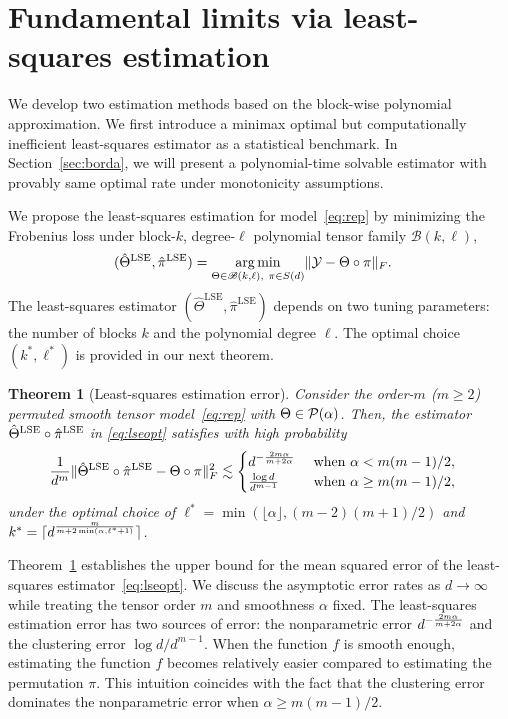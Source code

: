 \documentclass{article}
\newtheorem{thm}{Theorem}
\theoremstyle{definition}
\def\caliB{\mathscr{B}}
\begin{document}
\section{Fundamental limits via least-squares estimation}\label{sec:lse}
We develop two estimation methods based on the block-wise polynomial approximation. We first introduce a minimax optimal but computationally inefficient least-squares estimator as a statistical benchmark. In Section~\ref{sec:borda}, we will present a polynomial-time solvable estimator with provably same optimal rate under monotonicity assumptions.

We propose the least-squares estimation for model~\eqref{eq:rep} by minimizing the Frobenius loss under block-$k$, degree-$\ell$ polynomial tensor family $\caliB(k,\ell)$, 
\begin{align}\label{eq:lseopt}
    (\hat\Theta^{\text{LSE}},\hat \pi^{\text{LSE}}) &= \argmin_{\Theta\in\caliB(k,\ell), \  \pi\in S(d)}\FnormSize{}{\tY-\Theta\circ\pi}.
\end{align}
The least-squares estimator $(\hat\Theta^{\text{LSE}},\hat\pi^{\text{LSE}})$ depends on two tuning parameters: the number of blocks $k$ and the polynomial degree $\ell$. The optimal choice $(k^*,\ell^*)$ is provided in our next theorem. 
\begin{thm}[Least-squares estimation error]\label{thm:LSE} 
Consider the order-$m$ ($m\geq 2$) permuted smooth tensor model~\eqref{eq:rep} with $\Theta\in\mathcal{P}(\alpha)$.
Then, the estimator $\hat\Theta^{\textup{LSE}}\circ\hat\pi^{\textup{LSE}}$  in \eqref{eq:lseopt} satisfies with high probability 
\begin{align}\label{eq:rates}
   \frac{1}{d^m}&\lVert\hat\Theta^{\textup{LSE}}\circ\hat\pi^{\textup{LSE}}-\Theta\circ \pi\rVert_F^2\lesssim  \begin{cases}d^{-{2m\alpha\over m+2\alpha}} & \text{ when } \alpha < m(m-1)/2,\\{\log d\over d^{m-1}}&\text{ when } \alpha \geq m(m-1)/2,
   \end{cases}
\end{align}
under the optimal choice of $\ell^* = \min(\lfloor\alpha\rfloor,(m-2)(m+1)/2)$ and $k^* = \lceil d^{m\over m+2\min(\alpha,\ell^*+1)}\rceil$.
\end{thm}
Theorem~\ref{thm:LSE} establishes the upper bound for the mean squared error of the least-squares estimator~\eqref{eq:lseopt}. We discuss the asymptotic error rates as $d\rightarrow \infty$ while treating the tensor order $m$ and smoothness $\alpha$ fixed. 
The least-squares estimation error has two sources of error: the nonparametric error $d^{-{2m\alpha\over m+2\alpha}}$ and the clustering error $\log d/d^{m-1}$.  When the function $f$ is smooth enough, estimating the function $f$ becomes relatively easier compared to estimating the permutation $\pi$. This intuition coincides with the fact that the clustering error dominates the nonparametric error when  $\alpha\geq m(m-1)/2$. 
\end{document}
